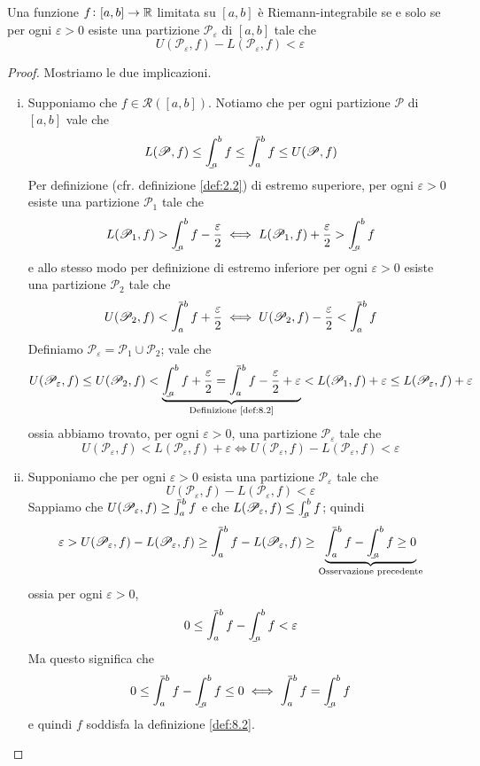 \begin{theorem}
    \label{th:8.1}
    Una funzione $f\colon [a,b]\to \amsbb{R}$ limitata su $[a,b]$ è Riemann-integrabile se e solo se per ogni $\varepsilon>0$ esiste una partizione $\mathscr{P}_\varepsilon$ di $[a,b]$ tale che
    \[
    U(\mathscr{P}_\varepsilon, f) - L(\mathscr{P}_\varepsilon, f)< \varepsilon
    \]
\end{theorem}
\begin{proof}
    Mostriamo le due implicazioni.
    \begin{enumerate}[(i)]
        \item Supponiamo che $f\in\mathscr{R}([a,b])$. Notiamo che per ogni partizione $\mathscr{P}$ di $[a,b]$ vale che
        \[
        L(\mathscr{P},f) \le \bint_a^b f \le \aint_a^b f \le U(\mathscr{P}, f)
        \]
        Per definizione (cfr. definizione \ref{def:2.2}) di estremo superiore, per ogni $\varepsilon>0$ esiste una partizione $\mathscr{P}_1$ tale che
        \[
        L(\mathscr{P}_1, f) > \bint_a^b f -\frac{\varepsilon}{2} \iff L(\mathscr{P}_1, f) + \frac{\varepsilon}{2}> \bint_a^b f
        \]
        e allo stesso modo per definizione di estremo inferiore per ogni $\varepsilon>0$ esiste una partizione $\mathscr{P}_2$ tale che
        \[
        U(\mathscr{P}_2, f) < \aint_a^b f +\frac{\varepsilon}{2} \iff U(\mathscr{P}_2, f) - \frac{\varepsilon}{2}<\aint_a^b f
        \]
        Definiamo $\mathscr{P}_\varepsilon = \mathscr{P}_1\cup \mathscr{P}_2$; vale che
        \[
        U(\mathscr{P}_\varepsilon, f) \le U(\mathscr{P}_2, f) < \underbrace{\bint_a^bf +\frac{\varepsilon}{2} = \aint_a^b f -\frac{\varepsilon}{2}+\varepsilon}_{\text{Definizione \ref{def:8.2}}} < L(\mathscr{P}_1, f)+\varepsilon \le L(\mathscr{P}_\varepsilon, f) + \varepsilon
        \]
        ossia abbiamo trovato, per ogni $\varepsilon>0$, una partizione $\mathscr{P}_\varepsilon$ tale che
        \[
        U(\mathscr{P}_\varepsilon, f) < L(\mathscr{P}_\varepsilon, f) + \varepsilon \iff U(\mathscr{P}_\varepsilon, f) - L(\mathscr{P}_\varepsilon, f) <  \varepsilon
        \]
        \item Supponiamo che per ogni $\varepsilon>0$ esista una partizione $\mathscr{P}_\varepsilon$ tale che
        \[
        U(\mathscr{P}_\varepsilon, f) - L(\mathscr{P}_\varepsilon, f)< \varepsilon
        \]
        Sappiamo che $U(\mathscr{P}_\varepsilon, f)\ge \aint_a^b f$ e che $L(\mathscr{P}_\varepsilon, f)\le \bint_a^b f$; quindi
        \[
        \varepsilon>U(\mathscr{P}_\varepsilon, f) - L(\mathscr{P}_\varepsilon, f) \ge \aint_a^b f - L(\mathscr{P}_\varepsilon, f) \ge \underbrace{\aint_a^b f - \bint_a^b f\ge 0}_{\text{Osservazione precedente}}
        \]
        ossia per ogni $\varepsilon>0$,
        \[
        0\le \aint_a^b f - \bint_a^b f <\varepsilon
        \]
        Ma questo significa che
        \[
        0\le \aint_a^b f - \bint_a^b f\le 0 \iff \aint_a^b f = \bint_a^b f
        \]
        e quindi $f$ soddisfa la definizione \ref{def:8.2}.\qedhere
    \end{enumerate}
\end{proof}
